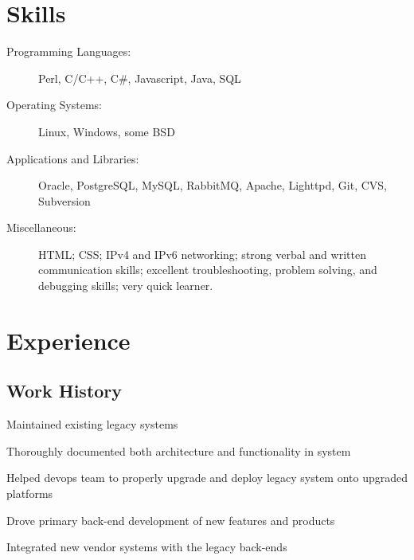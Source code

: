 \documentclass[table,tmargin=1in,bmargin=1in,letterpaper]{resume}
\author{Ryan Voots}
\begin{document}
\maketitle
\vspace{0.1in}

\section{Skills}
\begin{description}
\item[Programming Languages:]
Perl, C/C++, C\#, Javascript, Java, SQL
\item[Operating Systems:]
Linux, Windows, some BSD
\item[Applications and Libraries:]
Oracle, PostgreSQL, MySQL, RabbitMQ, Apache, Lighttpd, Git, CVS, Subversion
\item[Miscellaneous:]
HTML; CSS; IPv4 and IPv6 networking; strong verbal and written communication skills; excellent troubleshooting, problem solving, and debugging skills; very quick learner.
\end{description}

\section{Experience}

\subsection{Work History}

\begin{compactitem}
\item Maintained existing legacy systems
  \begin{compactitem}
  \item Thoroughly documented both architecture and functionality in system
  \item Helped devops team to properly upgrade and deploy legacy system onto upgraded platforms
  \end{compactitem}
\item Drove primary back-end development of new features and products
\item Integrated new vendor systems with the legacy back-ends
\end{compactitem}
\end{document}
